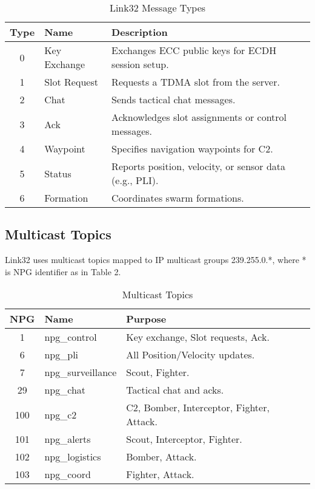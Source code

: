 \documentclass{article}
\begin{document}
\begin{table}[h]
\centering
\caption{Link32 Message Types}
\begin{tabular}{clp{6cm}}
\hline
\textbf{Type} & \textbf{Name} & \textbf{Description} \\
\hline
0 & Key Exchange & Exchanges ECC public keys for ECDH session setup. \\
1 & Slot Request & Requests a TDMA slot from the server. \\
2 & Chat         & Sends tactical chat messages. \\
3 & Ack          & Acknowledges slot assignments or control messages. \\
4 & Waypoint     & Specifies navigation waypoints for C2. \\
5 & Status       & Reports position, velocity, or sensor data (e.g., PLI). \\
6 & Formation    & Coordinates swarm formations. \\
\hline
\end{tabular}
\end{table}

\subsection{Multicast Topics}
Link32 uses multicast topics mapped to IP multicast groups 239.255.0.*, where * is NPG identifier as in Table 2.

\begin{table}[h]
\centering
\caption{Multicast Topics}
\begin{tabular}{cllp{5cm}}
\hline
\textbf{NPG} & \textbf{Name} & \textbf{Purpose} \\
\hline
1   & npg\_control      & Key exchange, Slot requests, Ack. \\
6   & npg\_pli          & All Position/Velocity updates. \\
7   & npg\_surveillance & Scout, Fighter. \\
29  & npg\_chat         & Tactical chat and acks. \\
100 & npg\_c2           & C2, Bomber, Interceptor, Fighter, Attack. \\
101 & npg\_alerts       & Scout, Interceptor, Fighter. \\
102 & npg\_logistics    & Bomber, Attack. \\
103 & npg\_coord        & Fighter, Attack. \\
\hline
\end{tabular}
\end{table}
\end{document}
